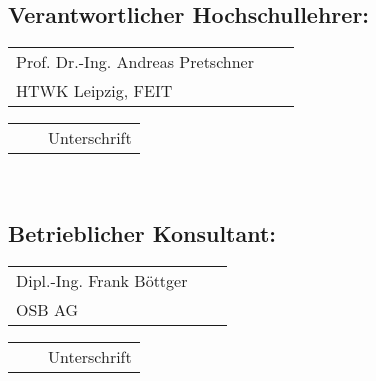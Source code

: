 \subsection*{Verantwortlicher Hochschullehrer:}
%
\begin{tabular}{p{} m{} b{}}
	Prof. Dr.-Ing. Andreas Pretschner	& &\\
	HTWK Leipzig, FEIT 								& &	\cline{1-1}
\end{tabular}
%
\hfill
%
\vspace{-0.1cm}
\begin{tabular}{m{} m{} p{}}
	&  & \footnotesize{Unterschrift}
\end{tabular}\\
%
\subsection*{Betrieblicher Konsultant:}
\begin{tabular}{p{} m{} b{}}
	Dipl.-Ing. Frank Böttger	& &\\
	OSB AG 								& &	\cline{1-1}
\end{tabular}
%
\hfill
%
\vspace{-0.1cm}
\begin{tabular}{m{} m{} p{}}
	&  & \footnotesize{Unterschrift}
\end{tabular}
